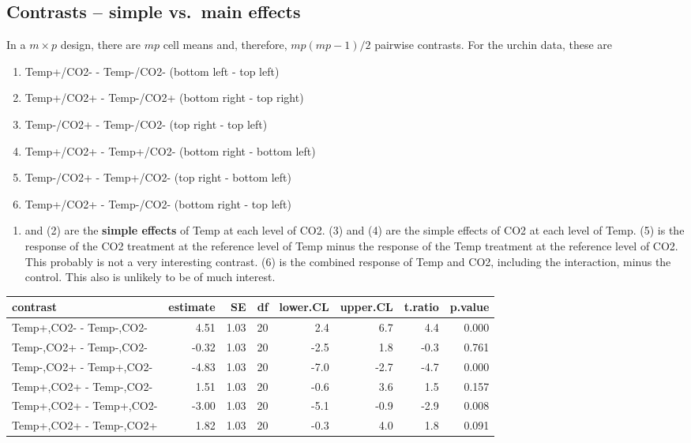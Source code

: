 \documentclass[]{book}
\providecommand{\tightlist}{%
  \setlength{\itemsep}{0pt}\setlength{\parskip}{0pt}}
\theoremstyle{definition}
\theoremstyle{definition}
\theoremstyle{definition}
\theoremstyle{remark}
\begin{document}
\subsection{Contrasts -- simple vs.~main
effects}\label{contrasts-simple-vs.main-effects}

In a \(m \times p\) design, there are \(mp\) cell means and, therefore,
\(mp(mp-1)/2\) pairwise contrasts. For the urchin data, these are

\begin{enumerate}
\def\labelenumi{\arabic{enumi}.}
\tightlist
\item
  Temp+/CO2- - Temp-/CO2- (bottom left - top left)
\item
  Temp+/CO2+ - Temp-/CO2+ (bottom right - top right)
\item
  Temp-/CO2+ - Temp-/CO2- (top right - top left)
\item
  Temp+/CO2+ - Temp+/CO2- (bottom right - bottom left)
\item
  Temp-/CO2+ - Temp+/CO2- (top right - bottom left)
\item
  Temp+/CO2+ - Temp-/CO2- (bottom right - top left)
\end{enumerate}

\begin{enumerate}
\def\labelenumi{(\arabic{enumi})}
\tightlist
\item
  and (2) are the \textbf{simple effects} of Temp at each level of CO2.
  (3) and (4) are the simple effects of CO2 at each level of Temp. (5)
  is the response of the CO2 treatment at the reference level of Temp
  minus the response of the Temp treatment at the reference level of
  CO2. This probably is not a very interesting contrast. (6) is the
  combined response of Temp and CO2, including the interaction, minus
  the control. This also is unlikely to be of much interest.
\end{enumerate}

\begin{tabular}{l|r|r|r|r|r|r|r}
\hline
contrast & estimate & SE & df & lower.CL & upper.CL & t.ratio & p.value\\
\hline
Temp+,CO2- - Temp-,CO2- & 4.51 & 1.03 & 20 & 2.4 & 6.7 & 4.4 & 0.000\\
\hline
Temp-,CO2+ - Temp-,CO2- & -0.32 & 1.03 & 20 & -2.5 & 1.8 & -0.3 & 0.761\\
\hline
Temp-,CO2+ - Temp+,CO2- & -4.83 & 1.03 & 20 & -7.0 & -2.7 & -4.7 & 0.000\\
\hline
Temp+,CO2+ - Temp-,CO2- & 1.51 & 1.03 & 20 & -0.6 & 3.6 & 1.5 & 0.157\\
\hline
Temp+,CO2+ - Temp+,CO2- & -3.00 & 1.03 & 20 & -5.1 & -0.9 & -2.9 & 0.008\\
\hline
Temp+,CO2+ - Temp-,CO2+ & 1.82 & 1.03 & 20 & -0.3 & 4.0 & 1.8 & 0.091\\
\hline
\end{tabular}
\end{document}
